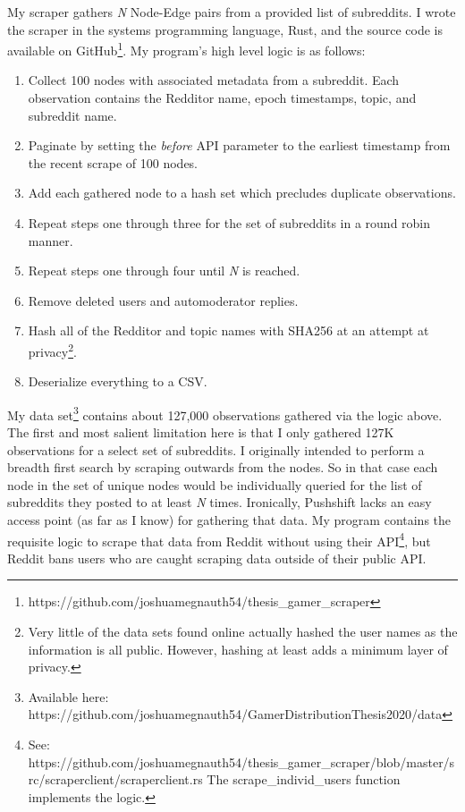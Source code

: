 \documentclass[12pt, a4paper]{article}
\begin{document}
My scraper gathers \textit{N} Node-Edge pairs from a provided list of subreddits. I wrote the scraper in the systems programming language, Rust, and the source code is available on GitHub\footnote{https://github.com/joshuamegnauth54/thesis\_gamer\_scraper}. My program's high level logic is as follows: 

\begin{enumerate}
  \item Collect 100 nodes with associated metadata from a subreddit. Each observation contains the Redditor name, epoch timestamps, topic, and subreddit name.
  \item Paginate by setting the \textit{before} API parameter to the earliest timestamp from the recent scrape of 100 nodes.
  \item Add each gathered node to a hash set which precludes duplicate observations.
  \item Repeat steps one through three for the set of subreddits in a round robin manner.
  \item Repeat steps one through four until \textit{N} is reached.
  \item Remove deleted users and automoderator replies.
  \item Hash all of the Redditor and topic names with SHA256 at an attempt at privacy\footnote{Very little of the data sets found online actually hashed the user names as the information is all public. However, hashing at least adds a minimum layer of privacy.}.
  \item Deserialize everything to a CSV.
\end{enumerate}

My data set\footnote{Available here: https://github.com/joshuamegnauth54/GamerDistributionThesis2020/data} contains about 127,000 observations gathered via the logic above. The first and most salient limitation here is that I only gathered 127K observations for a select set of subreddits. I originally intended to perform a breadth first search by scraping outwards from the nodes. So in that case each node in the set of unique nodes would be individually queried for the list of subreddits they posted to at least \textit{N} times. Ironically, Pushshift lacks an easy access point (as far as I know) for gathering that data. My program contains the requisite logic to scrape that data from Reddit without using their API\footnote{See: https://github.com/joshuamegnauth54/thesis\_gamer\_scraper/blob/master/src/scraperclient/scraperclient.rs The scrape\_individ\_users function implements the logic.}, but Reddit bans users who are caught scraping data outside of their public API.

\printbibliography
\end{document}
